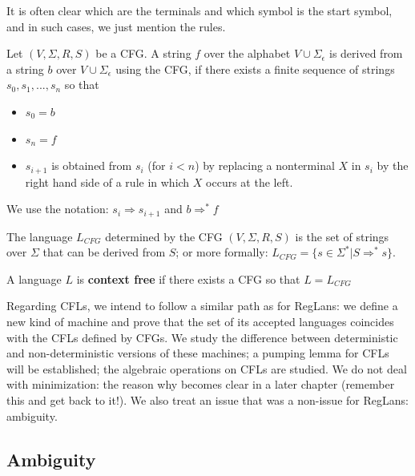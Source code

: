 It is often clear which are the terminals and which symbol is the
start symbol, and in such cases, we just mention the rules.

\begin{definition}
Let $(V,\Sigma,R,S)$ be a CFG.
A string $f$ over the alphabet $V \cup \Sigma_\epsilon$ is derived
from a string $b$ over $V \cup \Sigma_\epsilon$ using the CFG, if
there exists a finite sequence of strings $s_0, s_1, ..., s_n$
so that
\begin{itemize}
\item $s_0 = b$
\item $s_n = f$
\item $s_{i+1}$ is obtained from $s_i$ (for $i < n$) by replacing a nonterminal $X$ in
 $s_i$ by the right hand side of a rule in which
 $X$ occurs at the left.
\end{itemize}

We use the notation: $s_i \Rightarrow s_{i+1}$ and $b \Rightarrow^* f$
\end{definition}

\begin{definition}
The language $L_{CFG}$ determined by the CFG $(V,\Sigma,R,S)$ is the
set of strings over $\Sigma$ that can be derived from $S$; or more
formally: $L_{CFG} = \{s \in \Sigma^* | S \Rightarrow^* s\}$.
\end{definition}

\begin{definition}
A language $L$ is {\bf context free} if there exists a CFG so that $L
= L_{CFG}$
\end{definition}

Regarding CFLs, we intend to follow a similar path as for RegLans: we
define a new kind of machine and prove that the set of its accepted
languages coincides with the CFLs defined by CFGs. We study the
difference between deterministic and non-deterministic versions of
these machines; a pumping lemma for CFLs will be established; the
algebraic operations on CFLs are studied. We do not deal with
minimization: the reason why becomes clear in a later chapter
(remember this and get back to it!). We also treat an issue that was
a non-issue for RegLans: ambiguity.

\subsection{Ambiguity}

